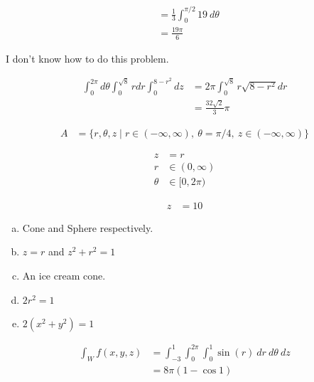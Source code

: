 \documentclass[10pt]{extarticle}
\begin{document}
\begin{problem}{16.4}
\begin{description}[font=\normalfont]
\begin{align*}
                                         &= \frac{1}{3}\int_{0}^{\pi/2}19~d\theta\\
                                         &= \frac{19\pi}{6}
        \end{align*}
      \item[20:] I don't know how to do this problem.
      \item[32:]
        \begin{align*}
          \int_{0}^{2\pi}d\theta\int_{0}^{\sqrt{8}}rdr\int_{0}^{8-r^2}dz &= 2\pi\int_{0}^{\sqrt{8}}r\sqrt{8-r^2}dr\\
                                                                         &= \frac{32\sqrt{2}}{3}\pi
        \end{align*}
    \end{description}
  \end{problem}
  \begin{problem}{16.5}
    \begin{description}[font=\normalfont]
      \item[2:]
        \begin{align*}
          A &= \{r,\theta,z\mid r\in(-\infty,\infty),~\theta=\pi/4,~z\in(-\infty,\infty)\}
        \end{align*}
      \item[4:]
        \begin{align*}
          z &= r\\
          r&\in(0,\infty)\\
          \theta&\in[0,2\pi)
        \end{align*}
      \item[6:] 
        \begin{align*}
          z &= 10
        \end{align*}
      \item[8:]
        \begin{enumerate}[(a)]
          \item Cone and Sphere respectively.
          \item $z = r$ and $z^2 + r^2 = 1$
          \item An ice cream cone.
          \item $2r^2 = 1$
          \item $2(x^2 + y^2) = 1$
        \end{enumerate}
      \item[10:]
        \begin{align*}
          \int_{W}f(x,y,z) &= \int_{-3}^{1}\int_{0}^{2\pi}\int_{0}^{1}\sin(r)~dr~d\theta~dz\\
                           &= 8\pi(1-\cos 1)
        \end{align*}
    \end{description}
  \end{problem}
\end{document}
